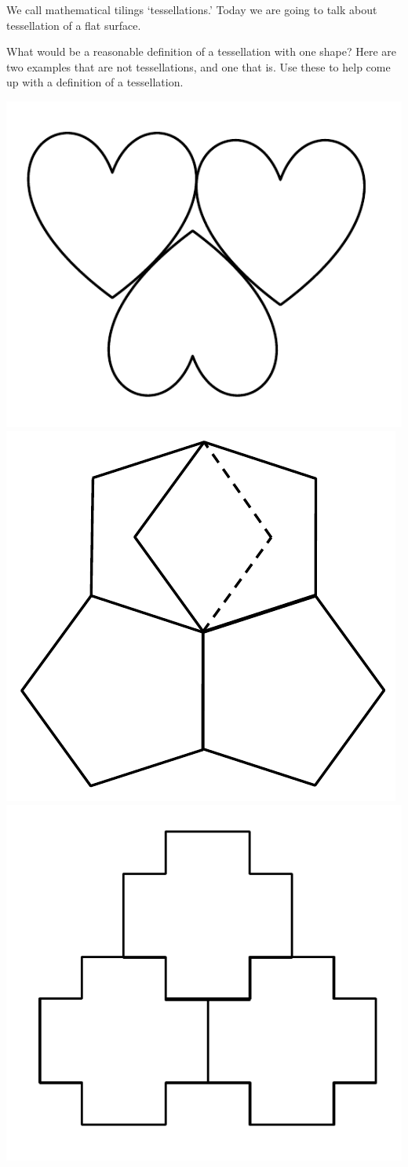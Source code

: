 \documentclass[noauthor,nooutcomes,handout]{ximera}
\begin{document}
\begin{question}
We call mathematical tilings `tessellations.' Today we are going to
talk about tessellation of a flat surface.

What would be a reasonable definition of a tessellation with one
shape? Here are two examples that are not tessellations, and one that
is. Use these to help come up with a definition of a tessellation.

\begin{center}
	\includegraphics[width=.3\textwidth]{hearts} \quad 
	\includegraphics[width=.3\textwidth]{pentagons} \quad
	\includegraphics[width=.3\textwidth]{crosses}
\end{center}

\end{question}
\mynewpage
\end{document}
